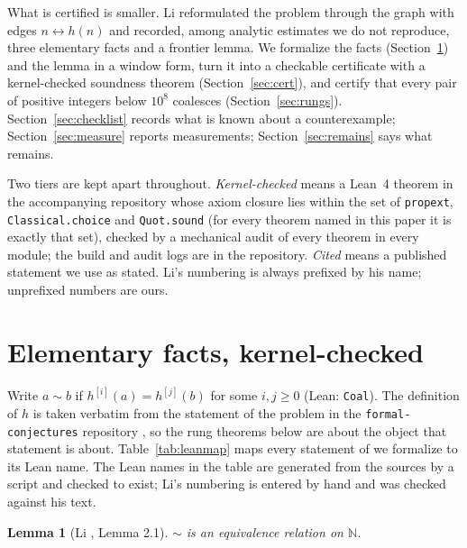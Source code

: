 \documentclass[11pt]{article}
\theoremstyle{plain}
\newtheorem{lemma}[theorem]{Lemma}
\theoremstyle{definition}
\newcommand{\N}{\mathbb{N}}
\newcommand{\Coal}{\sim}
\begin{document}
What is certified is smaller. Li \cite{Li26} reformulated the problem through the graph with edges $n \leftrightarrow h(n)$ and recorded, among analytic estimates we do not reproduce, three elementary facts and a frontier lemma. We formalize the facts (Section~\ref{sec:elementary}) and the lemma in a window form, turn it into a checkable certificate with a kernel-checked soundness theorem (Section~\ref{sec:cert}), and certify that every pair of positive integers below $10^8$ coalesces (Section~\ref{sec:rungs}). Section~\ref{sec:checklist} records what is known about a counterexample; Section~\ref{sec:measure} reports measurements; Section~\ref{sec:remains} says what remains.

Two tiers are kept apart throughout. \emph{Kernel-checked} means a Lean~4 theorem in the accompanying repository whose axiom closure lies within the set of \texttt{propext}, \texttt{Classical.choice} and \texttt{Quot.sound} (for every theorem named in this paper it is exactly that set), checked by a mechanical audit of every theorem in every module; the build and audit logs are in the repository. \emph{Cited} means a published statement we use as stated. Li's numbering is always prefixed by his name; unprefixed numbers are ours.

\section{Elementary facts, kernel-checked}
\label{sec:elementary}

Write $a\Coal b$ if $h^{[i]}(a)=h^{[j]}(b)$ for some $i,j\ge 0$ (Lean: \texttt{Coal}). The definition of $h$ is taken verbatim from the statement of the problem in the \texttt{formal-conjectures} repository \cite{FC}, so the rung theorems below are about the object that statement is about. Table~\ref{tab:leanmap} maps every statement of \cite{Li26} we formalize to its Lean name. The Lean names in the table are generated from the sources by a script and checked to exist; Li's numbering is entered by hand and was checked against his text.

\begin{table}[h]
\centering

\caption{Statements of \cite{Li26} and the Lean theorems establishing the forms stated here (one-step parity, integer square-root bound, window form of the frontier lemma). The last two rows are ours.}
\label{tab:leanmap}
\end{table}

\begin{lemma}[Li \cite{Li26}, Lemma 2.1]
\label{lem:equiv}
$\Coal$ is an equivalence relation on $\N$.
\end{lemma}
\end{document}
